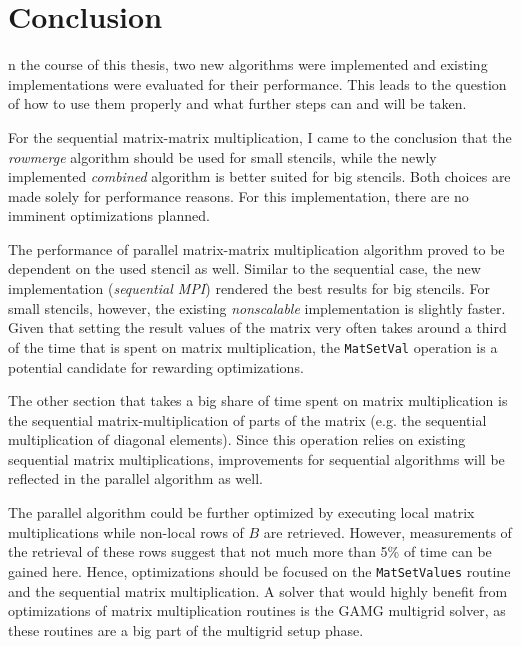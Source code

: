 \chapter*{Conclusion}

n the course of this thesis, two new algorithms were implemented and existing implementations were evaluated for their performance. This leads to the question of how to use them properly and what further steps can and will be taken. 

For the sequential matrix-matrix multiplication, I came to the conclusion that the \textit{rowmerge} algorithm should be used for small stencils, while the newly implemented \textit{combined} algorithm is better suited for big stencils. Both choices are made solely for performance reasons. For this implementation, there are no imminent optimizations planned. 

The performance of parallel matrix-matrix multiplication algorithm proved to be dependent on the used stencil as well. Similar to the sequential case, the new implementation (\textit{sequential MPI}) rendered the best results for big stencils. %
For small stencils, however, the existing \textit{nonscalable} implementation is slightly faster. Given that setting the result values of the matrix very often takes around a third of the time that is spent on matrix multiplication, the \texttt{MatSetVal} operation is a potential candidate for rewarding optimizations. 

The other section that takes a big share of time spent on matrix multiplication is the sequential matrix-multiplication of parts of the matrix (e.g. the sequential multiplication of diagonal elements). Since this operation relies on existing sequential matrix multiplications, improvements for sequential algorithms will be reflected in the parallel algorithm as well.

The parallel algorithm could be further optimized by executing local matrix multiplications while non-local rows of $B$ are retrieved. However, measurements of the retrieval of these rows suggest that not much more than 5\% of time can be gained here. Hence, optimizations should be focused on the \texttt{MatSetValues} routine and the sequential matrix multiplication. A solver that would highly benefit from optimizations of matrix multiplication routines is the GAMG multigrid solver, as these routines are a big part of the multigrid setup phase.